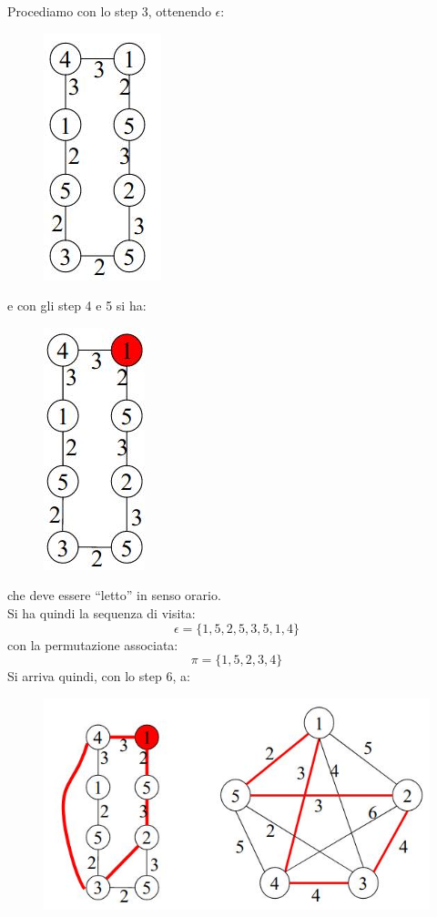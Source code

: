 \begin{esempio}
\begin{figure}[h!]
												      		\end{figure}
												      		Procediamo con lo step 3, ottenendo $\epsilon$:
												      		\begin{figure}[h!]
												      			\centering
												      			\includegraphics[scale = 0.4]{img/ch4.jpg}
												      		\end{figure}
												      		e con gli step 4 e 5 si ha:
												      		\begin{figure}[h!]
												      			\centering
												      			\includegraphics[scale = 0.4]{img/ch5.jpg}
												      		\end{figure}
												      		che deve essere ``letto'' in senso orario.\\
												      		Si ha quindi la sequenza di visita:
												      		\[\epsilon=\{1,5,2,5,3,5,1,4\}\]
												      		con la permutazione associata:
												      		\[\pi=\{1,5,2,3,4\}\]
												      		Si arriva quindi, con lo step 6, a:
												      		\begin{figure}[h!]
												      			\centering
												      			\includegraphics[scale = 0.4]{img/ch6.jpg}

\end{figure}
\end{esempio}
